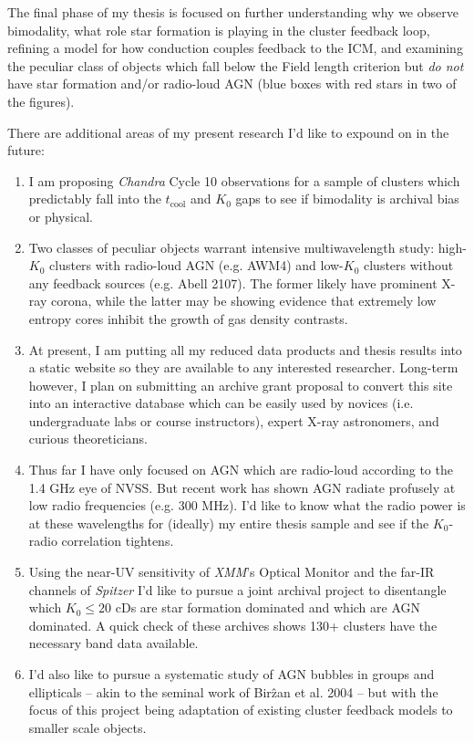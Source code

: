 \documentclass[11pt]{article}
\begin{document}
The final phase of my thesis is focused on further understanding why
we observe bimodality, what role star formation is playing in the cluster
feedback loop, refining a model for how conduction couples feedback to
the ICM, and examining the peculiar class of objects which fall below
the Field length criterion but {\it do not} have star formation and/or
radio-loud AGN (blue boxes with red stars in two of the figures).

There are additional areas of my present research I'd like to expound
on in the future:
\begin{enumerate}
\item I am proposing {\it Chandra} Cycle 10 observations for a sample
of clusters which predictably fall into the $t_{\mathrm{cool}}$ and
$K_0$ gaps to see if bimodality is archival bias or physical.
\item Two classes of peculiar objects warrant intensive
multiwavelength study: high-$K_0$ clusters with radio-loud AGN
(e.g. AWM4) and low-$K_0$ clusters without any feedback sources
(e.g. Abell 2107). The former likely have prominent X-ray corona,
while the latter may be showing evidence that extremely low entropy
cores inhibit the growth of gas density contrasts.
\item At present, I am putting all my reduced data products and thesis
results into a static website so they are available to any interested
researcher. Long-term however, I plan on submitting an archive grant
proposal to convert this site into an interactive database which can
be easily used by novices (i.e. undergraduate labs or course
instructors), expert X-ray astronomers, and curious theoreticians.
\item Thus far I have only focused on AGN which are radio-loud
according to the 1.4 GHz eye of NVSS. But recent work has shown AGN
radiate profusely at low radio frequencies (e.g. 300 MHz). I'd like to
know what the radio power is at these wavelengths for (ideally) my
entire thesis sample and see if the $K_0$-radio correlation tightens.
\item Using the near-UV sensitivity of {\it XMM}'s Optical Monitor and
the far-IR channels of {\it Spitzer} I'd like to pursue a joint
archival project to disentangle which $K_0 \leq 20$ cDs are star
formation dominated and which are AGN dominated. A quick check of these
archives shows 130+ clusters have the necessary band data available.
\item I'd also like to pursue a systematic study of AGN bubbles in
groups and ellipticals -- akin to the seminal work of Bir\^{z}an et
al. 2004 -- but with the focus of this project being adaptation of
existing cluster feedback models to smaller scale objects.
\end{enumerate}
\end{document}
